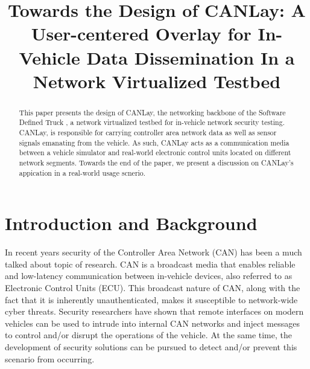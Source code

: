 \documentclass[letterpaper,twocolumn,12pt]{article}
\begin{document}

\date{}

\title{\Large \bf Towards the Design of CANLay: A User-centered Overlay for In-Vehicle Data Dissemination In a Network Virtualized Testbed}


\maketitle

\begin{abstract}
This paper presents the design of CANLay, the networking backbone of the Software Defined Truck \cite{mukherjee_towards_2021}, a network virtualized testbed for in-vehicle network security testing. CANLay, is responsible for carrying controller area network data as well as sensor signals emanating from the vehicle. As such, CANLay acts as a communication media between a vehicle simulator and real-world electronic control units located on different network segments. Towards the end of the paper, we present a discussion on CANLay's appication in a real-world usage scnerio.
\end{abstract}

\section{Introduction and Background}
In recent years security of the Controller Area Network (CAN) has been a much talked about topic of research. CAN is a broadcast media that enables reliable and low-latency communication between in-vehicle devices, also referred to as Electronic Control Units (ECU). This broadcast nature of CAN, along with the fact that it is inherently unauthenticated, makes it susceptible to network-wide cyber threats. 
Security researchers have shown \cite{checkoway_comprehensive_2011, mukherjee_practical_2016,burakova_truck_2016} that remote interfaces on modern vehicles can be used to intrude into internal CAN networks and inject messages to control and/or disrupt the operations of the vehicle. At the same time, the development of security solutions can be pursued to detect and/or prevent this scenario from occurring.
\end{document}
